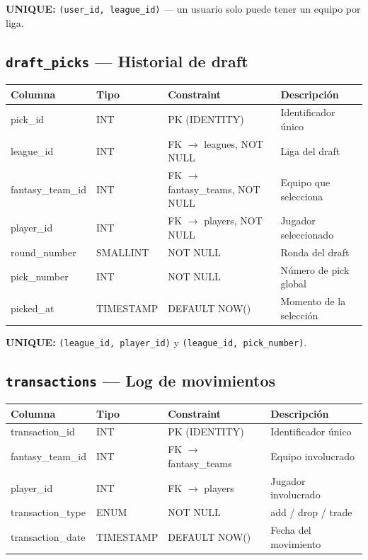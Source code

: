 \documentclass[12pt,a4paper]{article}
\begin{document}
\textbf{UNIQUE:} \texttt{(user\_id, league\_id)} --- un usuario solo puede tener un equipo por liga.

\subsection{\texttt{draft\_picks} --- Historial de draft}
\begin{tabular}{>{\ttfamily\small}l l l p{4.5cm}}
\toprule
\normalfont\textbf{Columna} & \textbf{Tipo} & \textbf{Constraint} & \textbf{Descripci\'on} \\
\midrule
pick\_id & INT & PK (IDENTITY) & Identificador \'unico \\
league\_id & INT & FK $\to$ leagues, NOT NULL & Liga del draft \\
fantasy\_team\_id & INT & FK $\to$ fantasy\_teams, NOT NULL & Equipo que selecciona \\
player\_id & INT & FK $\to$ players, NOT NULL & Jugador seleccionado \\
round\_number & SMALLINT & NOT NULL & Ronda del draft \\
pick\_number & INT & NOT NULL & N\'umero de pick global \\
picked\_at & TIMESTAMP & DEFAULT NOW() & Momento de la selecci\'on \\
\bottomrule
\end{tabular}

\textbf{UNIQUE:} \texttt{(league\_id, player\_id)} y \texttt{(league\_id, pick\_number)}.

\subsection{\texttt{transactions} --- Log de movimientos}
\begin{tabular}{>{\ttfamily\small}l l l p{5cm}}
\toprule
\normalfont\textbf{Columna} & \textbf{Tipo} & \textbf{Constraint} & \textbf{Descripci\'on} \\
\midrule
transaction\_id & INT & PK (IDENTITY) & Identificador \'unico \\
fantasy\_team\_id & INT & FK $\to$ fantasy\_teams & Equipo involucrado \\
player\_id & INT & FK $\to$ players & Jugador involucrado \\
transaction\_type & ENUM & NOT NULL & add / drop / trade \\
transaction\_date & TIMESTAMP & DEFAULT NOW() & Fecha del movimiento \\
\bottomrule
\end{tabular}
\end{document}
